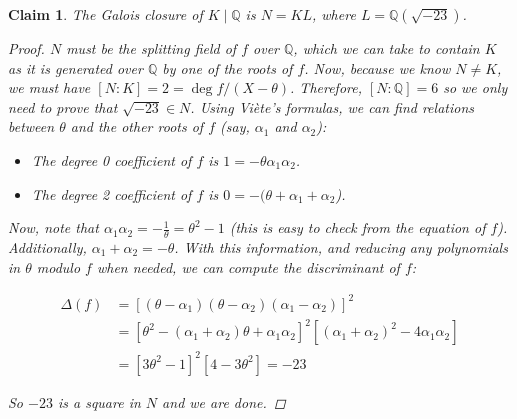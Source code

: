 \documentclass[11pt]{article}
\newtheorem{claim}[theorem]{Claim}
\theoremstyle{definition}
\begin{document}
    \begin{claim}
        The Galois closure of $K\mid\mathbb{Q}$ is $N = KL$,
        where $L = \mathbb{Q}\left(\sqrt{-23}\right)$.
        \begin{proof}

            $N$ must be the splitting field of $f$ over $\mathbb{Q}$,
            which we can take to contain $K$ as it is generated over $\mathbb{Q}$ by one of the roots of $f$.
            Now, because we know $N \neq K$, we must have $[N:K] = 2 = \deg f/(X - \theta)$.
            Therefore, $[N:\mathbb{Q}] = 6$ so we only need to prove that $\sqrt {-23} \in N$.
            Using Viète's formulas, we can find relations between $\theta$ and the other roots of $f$ (say, $\alpha_1$ and $\alpha_2$):
            \begin{itemize}
                \item The degree 0 coefficient of $f$ is $1 = - \theta \alpha_1 \alpha_2$.
                \item The degree 2 coefficient of $f$ is $0 = - (\theta + \alpha_1 + \alpha_2$).
            \end{itemize}
            Now, note that $\alpha_1 \alpha_2 = -\frac{1}{\theta} = \theta^2 - 1$ (this is easy to check from the equation of $f$).
            Additionally, $\alpha_1 + \alpha_2 = -\theta$.
            With this information, and reducing any polynomials in $\theta$ modulo $f$ when needed,
            we can compute the discriminant of $f$:

            \begin{align*}
                \Delta(f) &= [(\theta-\alpha_1) (\theta-\alpha_2) (\alpha_1 - \alpha_2)]^2 \\
                &= [\theta^2 - (\alpha_1 + \alpha_2) \theta + \alpha_1 \alpha_2]^2[(\alpha_1 + \alpha_2)^2 - 4 \alpha_1 \alpha_2] \\
                &= [3\theta^2-1]^2[4-3\theta^2] = -23
            \end{align*}

            So $-23$ is a square in $N$ and we are done.
        \end{proof}
        
    \end{claim}
\end{document}
